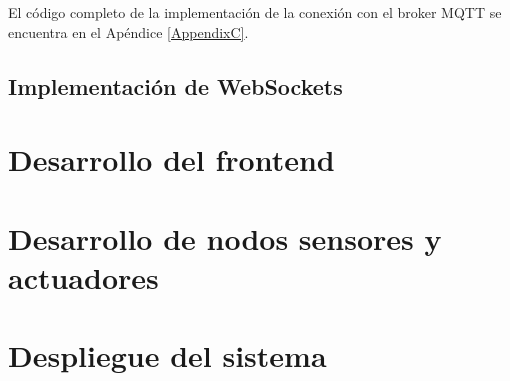 El código completo de la implementación de la conexión con el broker MQTT se
encuentra en el Apéndice \ref{AppendixC}.

\subsection{Implementación de WebSockets}


\section{Desarrollo del frontend}


\section{Desarrollo de nodos sensores y actuadores}


\section{Despliegue del sistema}

